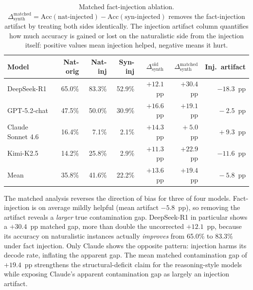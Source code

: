 \documentclass{article}
\theoremstyle{definition}
\begin{document}
\begin{table}[h]
\centering
\caption{Matched fact-injection ablation. $\Delta_{\mathrm{synth}}^{\mathrm{matched}} = \mathrm{Acc}(\text{nat-injected}) - \mathrm{Acc}(\text{syn-injected})$ removes the fact-injection artifact by treating both sides identically. The injection artifact column quantifies how much accuracy is gained or lost on the naturalistic side from the injection itself: positive values mean injection helped, negative means it hurt.}
\label{tab:contamination_matched}
\small
\begin{tabular}{@{}lrrrrrr@{}}
\toprule
\textbf{Model} & Nat-orig & Nat-inj & Syn-inj & $\Delta_{\mathrm{synth}}^{\mathrm{old}}$ & $\Delta_{\mathrm{synth}}^{\mathrm{matched}}$ & Inj.\ artifact \\
\midrule
DeepSeek-R1        & 65.0\% & 83.3\% & 52.9\% & $+12.1$~pp & $+30.4$~pp & $-18.3$~pp \\
GPT-5.2-chat       & 47.5\% & 50.0\% & 30.9\% & $+16.6$~pp & $+19.1$~pp & $\phantom{0}-2.5$~pp \\
Claude Sonnet 4.6  & 16.4\% & \phantom{0}7.1\% & \phantom{0}2.1\% & $+14.3$~pp & $\phantom{0}+5.0$~pp & $\phantom{0}+9.3$~pp \\
Kimi-K2.5          & 14.2\% & 25.8\% & \phantom{0}2.9\% & $+11.3$~pp & $+22.9$~pp & $-11.6$~pp \\
\midrule
Mean               & 35.8\% & 41.6\% & 22.2\% & $+13.6$~pp & $+19.4$~pp & $\phantom{0}-5.8$~pp \\
\bottomrule
\end{tabular}
\end{table}

The matched analysis reverses the direction of bias for three of four models. Fact-injection is on average mildly helpful (mean artifact $-5.8$~pp), so removing the artifact reveals a \emph{larger} true contamination gap. DeepSeek-R1 in particular shows a $+30.4$~pp matched gap, more than double the uncorrected $+12.1$~pp, because its accuracy on naturalistic instances actually \emph{improves} from 65.0\% to 83.3\% under fact injection. Only Claude shows the opposite pattern: injection harms its decode rate, inflating the apparent gap. The mean matched contamination gap of $+19.4$~pp strengthens the structural-deficit claim for the reasoning-style models while exposing Claude's apparent contamination gap as largely an injection artifact.
\end{document}
